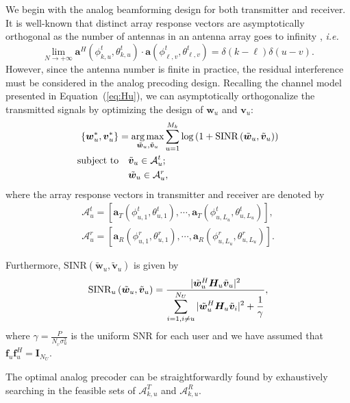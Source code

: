 \documentclass[10pt,journal,twocolumn,twoside]{IEEEtran}
\def\argmax{\mathop{\mbox{arg\,max}}}
\begin{document}
We begin with the analog beamforming design for both transmitter and receiver. It is well-known that distinct array response vectors are asymptotically orthogonal as the number of antennas in an antenna array goes to infinity \cite{sun2015beam}, {\em i.e.}
\begin{equation}\label{Eq:assumption}
\lim_{N\rightarrow +\infty} \bm{a}^{H}(\phi^t_{k,u},\theta^t_{k,u}) \cdot\bm{a}(\phi^t_{\ell,v},\theta^t_{\ell,v})=\delta(k-\ell)\delta(u-v).
\end{equation}
However, since the antenna number is finite in practice, the residual interference must be considered in the analog precoding design. Recalling the channel model presented in Equation~(\ref{eq:Hu}), we can asymptotically orthogonalize the transmitted signals by optimizing the design of $\bm{{w}}_{u}$ and $\bm{{v}}_{u}$:
\begin{align}\label{eq:group-scheduling}
\{\bm{{w}}^*_{u}, \bm{{v}}^*_{u}\} &=\underset{\tilde{\bm w }_{u}, \tilde{\bm v}_{u}}{\argmax}
\sum_{u=1}^{M_k}\log\left(1+ \text{SINR}\left(\tilde{\bm w}_{u}, \tilde{\bm v}_{u}\right)\right)  \\ \nonumber
\text{subject to}&\quad \tilde{\bm v}_{u}\in \mathcal{A}^t_{u};\\
&\quad \tilde{\bm w}_{u}\in \mathcal{A}^r_{u}, \nonumber
\end{align}
where the array response vectors in transmitter and receiver are denoted by
\begin{align}
\mathcal{A}^t_{u} = \left[\bm{a}_{T}(\phi^t_{{u,1}},\theta^t_{{u,1}}),\cdots,\bm{a}_{T}(\phi^t_{{u,L_{u}}},\theta^t_{{u,L_{u}}})\right],
\nonumber \\
\mathcal{A}^r_{u} = \left[\bm{a}_{R}(\phi^r_{{u,1}},\theta^r_{{u,1}}),\cdots,\bm{a}_{R}(\phi^r_{{u,L_{u}}},\theta^r_{{u,L_{u}}})\right].
\end{align}

Furthermore, $\text{SINR}\left(\tilde{\bm w}_{u}, \tilde{\bm v}_{u}\right)$ is given by
\begin{equation}\label{SINR}
\text{SINR}_u\left(\tilde{\bm w}_{u}, \tilde{\bm v}_{u}\right) = \frac{|\tilde{\bm w}^H_{u} \bm{H}_{u} \tilde{\bm v}_{u}|^2}{\displaystyle\sum_{i=1,i\neq u}^{N_U}|\tilde{\bm w}^H_{u} \bm{H}_{u}\tilde{\bm {v}}_i|^2 + {1 \over \gamma} },
\end{equation}
where $\gamma = \frac{P}{N_{_U}\sigma_{u}^2}$ is the uniform SNR for each user and we have assumed that $\bm{f}_u\bm{f}_u^H = \bm{I}_{N_U}$.


The optimal analog precoder can be straightforwardly found by  exhaustively searching in the feasible sets of $\mathcal{A}^T_{k,u}$ and $\mathcal{A}^R_{k,u}$.
\end{document}
